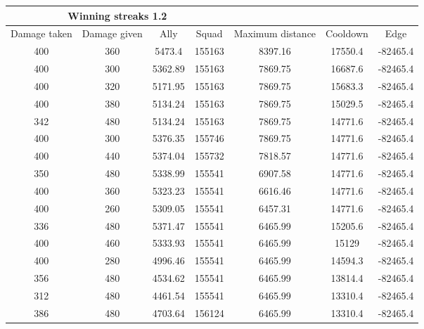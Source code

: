 \begin{centering}
 \begin{tabular}{|c|c|c|c|c|c|c|}
	\multicolumn{4}{c}{Winning streaks 1.2} \\
	\hline
	Damage taken & Damage given & Ally & Squad & Maximum distance & Cooldown & Edge \\
	\hline
	400&		360&			5473.4&	 155163&	8397.16&		17550.4&	-82465.4\\
	400&		300&			5362.89& 155163&	7869.75&		16687.6&	-82465.4\\
	400&		320&			5171.95& 155163&	7869.75&		15683.3&	-82465.4\\
	400&		380&			5134.24& 155163&	7869.75&		15029.5&	-82465.4\\
	342&		480&			5134.24& 155163&	7869.75&		14771.6&	-82465.4\\
	400&		300&			5376.35& 155746&	7869.75&		14771.6&	-82465.4\\
	400&		440&			5374.04& 155732&	7818.57&		14771.6&	-82465.4\\
	350&		480&			5338.99& 155541&	6907.58&		14771.6&	-82465.4\\
	400&		360&			5323.23& 155541&	6616.46&		14771.6&	-82465.4\\
	400&		260&			5309.05& 155541&	6457.31&		14771.6&	-82465.4\\
	336&		480&			5371.47& 155541&	6465.99&		15205.6&	-82465.4\\
	400&		460&			5333.93& 155541&	6465.99&		15129& 		-82465.4\\
	400&		280&			4996.46& 155541&	6465.99&		14594.3&	-82465.4\\
	356&		480&			4534.62& 155541&	6465.99&		13814.4&	-82465.4\\
	312&		480&			4461.54& 155541&	6465.99&		13310.4&	-82465.4\\
	386&		480&			4703.64& 156124&	6465.99&		13310.4&	-82465.4\\
	\hline
\end{tabular}
	\label{winning_streak_2.2}
\end{centering}















